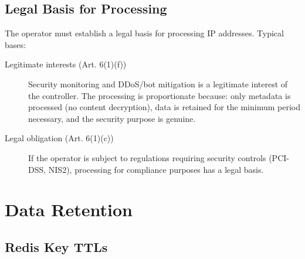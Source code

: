 \subsection{Legal Basis for Processing}

The operator must establish a legal basis for processing IP addresses. Typical bases:

\begin{description}
  \item[Legitimate interests (Art. 6(1)(f))] Security monitoring and DDoS/bot
    mitigation is a legitimate interest of the controller. The processing is
    proportionate because: only metadata is processed (no content decryption),
    data is retained for the minimum period necessary, and the security purpose
    is genuine.
  \item[Legal obligation (Art. 6(1)(c))] If the operator is subject to regulations
    requiring security controls (PCI-DSS, NIS2), processing for compliance purposes
    has a legal basis.
\end{description}

\section{Data Retention}

\subsection{Redis Key TTLs}

